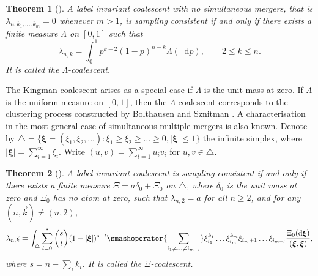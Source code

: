 \documentclass[reqno,draft]{amsart}
\numberwithin{equation}{section}
\theoremstyle{plain}
\newtheorem{theorem}{Theorem}[section]
\theoremstyle{remark}
\newcommand*\diff{\mathop{}\!\mathrm{d}}
\newcommand{\ind}{\mathds{1}}
\newcommand{\lank}{\lambda_{n,\smash{\vec{k}}}}
\begin{document}
\begin{theorem}[\cite{DK99,pitmanlambda,sagitovlambda}]\label{thm:lambdaintro}
    A label invariant coalescent with no simultaneous mergers, that is $\lambda_{n,k_1, \ldots ,k_m} = 0$ whenever $m > 1$, is sampling consistent if and only if there exists a finite measure $\Lambda$ on $[0,1]$ such that \[
        \lambda_{n,k} = \int_0^1 p^{k-2} (1-p)^{n-k} \Lambda(\diff p),\qquad 2 \le k \le n.
    \] It is called the \emph{$\Lambda$-coalescent}.
\end{theorem}

The Kingman coalescent arises as a special case if $\Lambda$ is the unit mass at zero. If $\Lambda$ is the uniform measure on $[0,1]$, then the $\Lambda$-coalescent corresponds to the clustering process constructed by Bolthausen and Sznitman \cite{bolthausensznitman}.
A characterisation in the most general case of simultaneous multiple mergers is also known. Denote by $\triangle = \{\boldsymbol \xi = (\xi_1,\xi_2,\ldots ) \colon \xi_1 \ge \xi_2 \ge \ldots \ge 0, |\boldsymbol \xi| \le 1\}$ the infinite simplex, where $|\boldsymbol \xi| = \sum_{i=1}^\infty \xi_i$. Write $(u,v) = \sum_{i=1}^\infty u_iv_i$ for $u,v\in \triangle$.

\begin{theorem}[\cite{schweinsbergxi,haploid}]\label{thm:xiintro}
    A label invariant coalescent is sampling consistent if and only if there exists a finite measure $\Xi = a\delta_0 + \Xi_0$ on $\triangle$, where $\delta_0$ is the unit mass at zero and $\Xi_0$ has no atom at zero, such that $\lambda_{n,2} = a$ for all $n\ge 2$, and for any $(n,\vec{k}) \neq (n,2)$,
    \begin{equation}\label{eq:xirates}
        \lank = \int_\triangle \sum_{l=0}^s \binom{s}{l}  (1 - |\boldsymbol \xi|)^{s-l} \smashoperator{\sum_{i_1 \neq \ldots \neq i_{m+l}}} \xi_{i_1}^{k_1}\ldots \xi_{i_m}^{k_m} \xi_{i_m+1}\ldots \xi_{i_{m+l}} \frac{\Xi_0(\diff \boldsymbol \xi)}{(\boldsymbol \xi,\boldsymbol \xi)} ,%
    \end{equation}
    where $s = n - \sum_i k_i$. It is called the \emph{$\Xi$-coalescent}.
\end{theorem}
\end{document}
